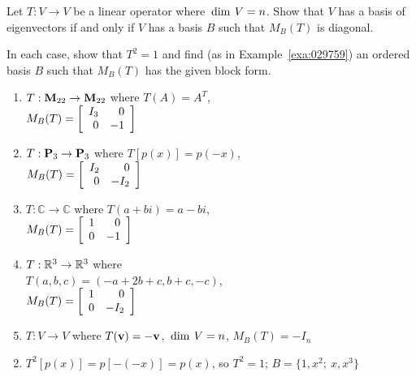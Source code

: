 \begin{multicols}{2}
\begin{ex}
Let $T : V \to V$ be a linear operator where $\thinspace\operatorname{dim \medspace}V = n$. Show that $V$ has a basis of eigenvectors if and only if $V$ has a basis $B$ such that $M_{B}(T)$ is diagonal.
\end{ex}

\begin{ex}
In each case, show that $T^{2} = 1$ and find (as in Example~\ref{exa:029759}) an ordered basis $B$ such that $M_{B}(T)$ has the given block form.


\begin{enumerate}[label={\alph*.}]
\item $T : \textbf{M}_{22} \to \textbf{M}_{22}$ where $T(A) = A^T$, \\ $M_B(T) = \left[ \begin{array}{rr} I_3 & 0 \\ 0 & -1 \end{array} \right]$

\item $T : \textbf{P}_3 \to \textbf{P}_3$ where $T[p(x)] = p(-x)$, \\ $M_B(T) = \left[ \begin{array}{rr} I_2 & 0 \\ 0 & -I_2 \end{array} \right]$

\item $T : \mathbb{C} \to \mathbb{C}$ where $T(a + bi) = a - bi$, \\ $M_B(T) = \left[ \begin{array}{rr} 1 & 0 \\ 0 & -1 \end{array} \right]$

\item $T : \mathbb{R}^3 \to \mathbb{R}^3$ where \\ $T(a, b, c) = (-a + 2b + c, b + c, -c)$, \\$M_B(T) = \left[ \begin{array}{rr} 1 & 0 \\ 0 & -I_2 \end{array} \right]$

\item $T : V \to V$ where $T(\textbf{v}) = -\textbf{v}$, $\thinspace\operatorname{dim \medspace}V = n$, $M_{B}(T) = -I_{n}$

\end{enumerate}
\begin{sol}
\begin{enumerate}[label={\alph*.}]
\setcounter{enumi}{1}
\item $T^{2}[p(x)] = p[-(-x)] = p(x)$, so $T^{2} = 1$; $B = \{1, x^{2};\ x, x^{3}\}$


\end{enumerate}
\end{sol}
\end{ex}
\end{multicols}
